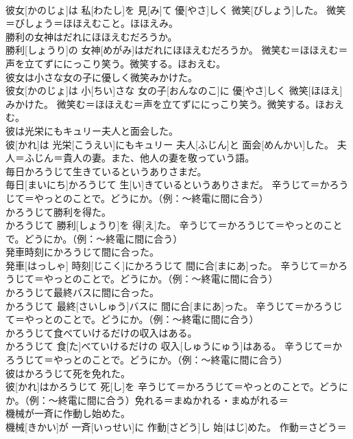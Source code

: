 \documentclass[8pt]{extreport}
\begin{document}
\begin{CJK}{UTF8}{min}
{\\	彼女[かのじょ]は 私[わたし]を 見[み]て 優[やさ]しく 微笑[びしょう]した。	微笑＝びしょう＝ほほえむこと。ほほえみ。
\\	勝利の女神はだれにほほえむだろうか。	
\\	勝利[しょうり]の 女神[めがみ]はだれにほほえむだろうか。	微笑む＝ほほえむ＝声を立てずににっこり笑う。微笑する。ほおえむ。
\\	彼女は小さな女の子に優しく微笑みかけた。	
\\	彼女[かのじょ]は 小[ちい]さな 女の子[おんなのこ]に 優[やさ]しく 微笑[ほほえ]みかけた。	微笑む＝ほほえむ＝声を立てずににっこり笑う。微笑する。ほおえむ。
\\	彼は光栄にもキュリー夫人と面会した。	
\\	彼[かれ]は 光栄[こうえい]にもキュリー 夫人[ふじん]と 面会[めんかい]した。	夫人＝ふじん＝貴人の妻。また、他人の妻を敬っていう語。
\\	毎日かろうじて生きているというありさまだ。	
\\	毎日[まいにち]かろうじて 生[い]きているというありさまだ。	辛うじて＝かろうじて＝やっとのことで。どうにか。（例：〜終電に間に合う）
\\	かろうじて勝利を得た。	
\\	かろうじて 勝利[しょうり]を 得[え]た。	辛うじて＝かろうじて＝やっとのことで。どうにか。（例：〜終電に間に合う）
\\	発車時刻にかろうじて間に合った。	
\\	発車[はっしゃ] 時刻[じこく]にかろうじて 間に合[まにあ]った。	辛うじて＝かろうじて＝やっとのことで。どうにか。（例：〜終電に間に合う）
\\	かろうじて最終バスに間に合った。	
\\	かろうじて 最終[さいしゅう]バスに 間に合[まにあ]った。	辛うじて＝かろうじて＝やっとのことで。どうにか。（例：〜終電に間に合う）
\\	かろうじて食べていけるだけの収入はある。	
\\	かろうじて 食[た]べていけるだけの 収入[しゅうにゅう]はある。	辛うじて＝かろうじて＝やっとのことで。どうにか。（例：〜終電に間に合う）
\\	彼はかろうじて死を免れた。	
\\	彼[かれ]はかろうじて 死[し]を	辛うじて＝かろうじて＝やっとのことで。どうにか。（例：〜終電に間に合う）免れる＝まぬかれる・まぬがれる＝ 
\\	機械が一斉に作動し始めた。	
\\	機械[きかい]が 一斉[いっせい]に 作動[さどう]し 始[はじ]めた。	作動＝さどう＝ 
}
\end{CJK}
\end{document}
